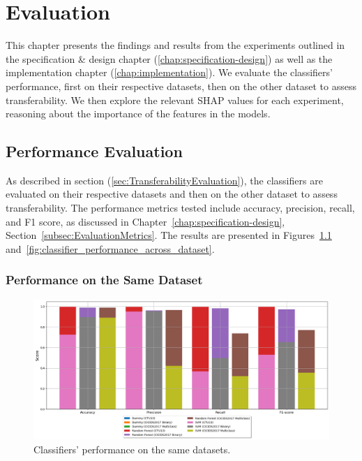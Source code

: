 \chapter{Evaluation}\label{chap:evaluation}

This chapter presents the findings and results from the experiments outlined in the specification \& design chapter (\ref{chap:specification-design}) as well as the implementation chapter (\ref{chap:implementation}). We evaluate the classifiers' performance, first on their respective datasets, then on the other dataset to assess transferability. We then explore the relevant SHAP values for each experiment, reasoning about the importance of the features in the models.

\section{Performance Evaluation}\label{sec:performance-evaluation}

As described in section (\ref{sec:TransferabilityEvaluation}), the classifiers are evaluated on their respective datasets and then on the other dataset to assess transferability. The performance metrics tested include accuracy, precision, recall, and F1 score, as discussed in Chapter~\ref{chap:specification-design}, Section~\ref{subsec:EvaluationMetrics}. The results are presented in Figures~\ref{fig:classifier_performance_same_dataset} and~\ref{fig:classifier_performance_across_dataset}.

\subsection{Performance on the Same Dataset}\label{subsec:performance-same-dataset}

\begin{figure}[H]
\centering
\includegraphics[width=\textwidth]{img/Classifier_Performance_Same_Dataset.png}
\caption{Classifiers' performance on the same datasets.}\label{fig:classifier_performance_same_dataset}
\end{figure}

